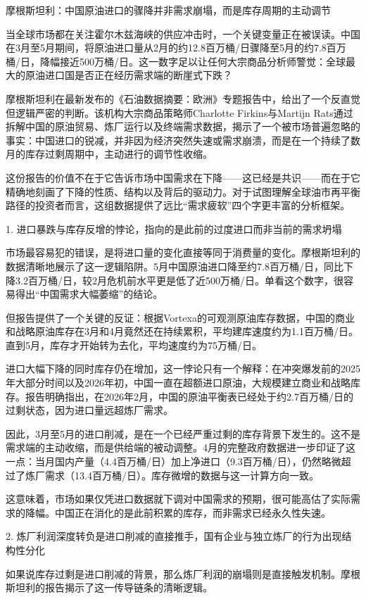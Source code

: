\documentclass[11pt]{ctexart}
\begin{document}
摩根斯坦利：中国原油进口的骤降并非需求崩塌，而是库存周期的主动调节

当全球市场都在关注霍尔木兹海峡的供应冲击时，一个关键变量正在被误读。中国在3月至5月期间，将原油进口量从2月的约12.8百万桶/日骤降至5月的约7.8百万桶/日，降幅接近500万桶/日。这一数字足以让任何大宗商品分析师警觉：全球最大的原油进口国是否正在经历需求端的断崖式下跌？

摩根斯坦利在最新发布的《石油数据摘要：欧洲》专题报告中，给出了一个反直觉但逻辑严密的判断。该机构大宗商品策略师Charlotte Firkins与Martijn Rats通过拆解中国的原油贸易、炼厂运行以及终端需求数据，揭示了一个被市场普遍忽略的事实：中国进口的锐减，并非因为经济突然失速或需求崩溃，而是在一个持续了数月的库存过剩周期中，主动进行的调节性收缩。

这份报告的价值不在于它告诉市场中国需求在下降——这已经是共识——而在于它精确地刻画了下降的性质、结构以及背后的驱动力。对于试图理解全球油市再平衡路径的投资者而言，这组数据提供了远比“需求疲软”四个字更丰富的分析框架。

1. 进口暴跌与库存反增的悖论，指向的是此前的过度进口而非当前的需求坍塌

市场最容易犯的错误，是将进口量的变化直接等同于消费量的变化。摩根斯坦利的数据清晰地展示了这一逻辑陷阱。5月中国原油进口降至约7.8百万桶/日，同比下降3.2百万桶/日，较2月危机前水平更是低了近500万桶/日。单看这个数字，很容易得出“中国需求大幅萎缩”的结论。

但报告提供了一个关键的反证：根据Vortexa的可观测原油库存数据，中国的商业和战略原油库存在3月和4月竟然还在持续累积，平均建库速度约为1.1百万桶/日。直到5月，库存才开始转为去化，平均速度约为75万桶/日。

进口大幅下降的同时库存仍在增加，这一悖论只有一个解释：在冲突爆发前的2025年大部分时间以及2026年初，中国一直在超额进口原油，大规模建立商业和战略库存。报告明确指出，在2026年2月，中国的原油平衡表已经处于约2.7百万桶/日的过剩状态，因为进口量远超炼厂需求。

因此，3月至5月的进口削减，是在一个已经严重过剩的库存背景下发生的。这不是需求端的主动收缩，而是供给端的被动调整。4月的完整政府数据进一步印证了这一点：当月国内产量（4.4百万桶/日）加上净进口（9.3百万桶/日），仍然略微超过了炼厂需求（13.4百万桶/日）。库存微增的数据与这一计算方向一致。

这意味着，市场如果仅凭进口数据就下调对中国需求的预期，很可能高估了实际需求的降幅。中国正在消化的是此前积累的库存，而非需求已经永久性失速。

2. 炼厂利润深度转负是进口削减的直接推手，国有企业与独立炼厂的行为出现结构性分化

如果说库存过剩是进口削减的背景，那么炼厂利润的崩塌则是直接触发机制。摩根斯坦利的报告揭示了这一传导链条的清晰逻辑。
\end{document}

